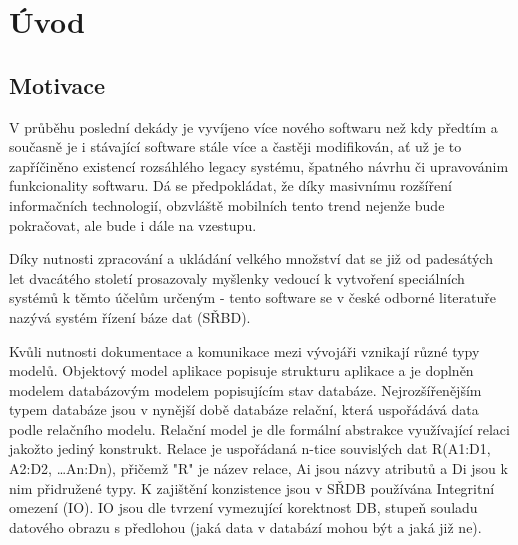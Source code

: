\documentclass[11pt,twoside,a4paper]{book}
\begin{document}
\listoftables



\mainbodystarts


% 
% 

\chapter{Úvod}
\section{Motivace}

V průběhu poslední dekády je vyvíjeno více nového softwaru než kdy předtím a
současně je i stávající software stále více a častěji modifikován, ať už
je to zapříčiněno  existencí rozsáhlého legacy systému, špatného návrhu či
upravovánim funkcionality softwaru. Dá se předpokládat, že díky masivnímu
rozšíření informačních technologií, obzvláště mobilních tento trend nejenže bude
pokračovat, ale bude i dále na vzestupu.

Díky nutnosti zpracování a ukládání velkého množství dat se již od padesátých
let dvacátého století prosazovaly myšlenky vedoucí k vytvoření speciálních
systémů k těmto účelům určeným - tento software se v české odborné literatuře
nazývá systém řízení báze dat (SŘBD). 

Kvůli nutnosti dokumentace a komunikace mezi vývojáři vznikají různé typy
modelů. Objektový model aplikace popisuje strukturu aplikace a je doplněn 
modelem databázovým modelem popisujícím stav databáze. Nejrozšířenějším typem
databáze jsou v nynější době databáze relační, která uspořádává data podle
relačního modelu. Relační model je dle \cite{DBS_02} formální abstrakce
využívající relaci jakožto jediný konstrukt. Relace je uspořádaná n-tice
souvislých dat R(A1:D1, A2:D2, \ldots An:Dn), přičemž "R" je název relace, Ai
jsou názvy atributů a Di jsou k nim přidružené typy. K zajištění konzistence
jsou v SŘDB používána Integritní omezení (IO). IO jsou dle \cite{DBS2_02} tvrzení
vymezující korektnost DB, stupeň souladu datového obrazu s předlohou (jaká data
v databází mohou být a jaká již ne).
\end{document}
